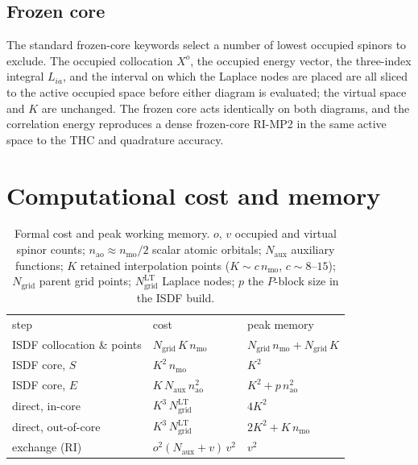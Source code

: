 \documentclass[aip,jcp,amsmath,amssymb,preprint,superscriptaddress]{revtex4-2}%
\newcommand{\Naux}{N_{\mathrm{aux}}}
\newcommand{\Ngrid}{N_{\mathrm{grid}}}
\begin{document}
\subsection{Frozen core}

The standard frozen-core keywords select a number of lowest occupied
spinors to exclude. The occupied collocation $X^{o}$, the occupied energy
vector, the three-index integral $L_{ia}$, and the interval on which the
Laplace nodes are placed are all sliced to the active occupied space before
either diagram is evaluated; the virtual space and $K$ are unchanged. The
frozen core acts identically on both diagrams, and the correlation energy
reproduces a dense frozen-core RI-MP2 in the same active space to the THC
and quadrature accuracy.

\section{Computational cost and memory}
\label{sec:cost}

\begin{table}[t]
\caption{Formal cost and peak working memory. $o$, $v$ occupied and virtual
spinor counts; $n_{\mathrm{ao}}\approx n_{\mathrm{mo}}/2$ scalar atomic
orbitals; $\Naux$ auxiliary functions; $K$ retained interpolation points
($K\sim c\,n_{\mathrm{mo}}$, $c\sim 8$--$15$); $\Ngrid$ parent grid points;
$\Ngrid^{\mathrm{LT}}$ Laplace nodes; $p$ the $P$-block size in the ISDF
build.}
\label{tab:cost}
\begin{ruledtabular}
\begin{tabular}{lll}
step & cost & peak memory \\
\colrule
ISDF collocation \& points & $\Ngrid\,K\,n_{\mathrm{mo}}$ &
   $\Ngrid\,n_{\mathrm{mo}} + \Ngrid\,K$ \\
ISDF core, $S$ & $K^{2}\,n_{\mathrm{mo}}$ & $K^{2}$ \\
ISDF core, $E$ & $K\,\Naux\,n_{\mathrm{ao}}^{2}$ &
   $K^{2}+p\,n_{\mathrm{ao}}^{2}$ \\
direct, in-core     & $K^{3}\,\Ngrid^{\mathrm{LT}}$ & $4K^{2}$ \\
direct, out-of-core & $K^{3}\,\Ngrid^{\mathrm{LT}}$ &
   $2K^{2}+K\,n_{\mathrm{mo}}$ \\
exchange (RI)       & $o^{2}(\Naux+v)\,v^{2}$ & $v^{2}$ \\
\end{tabular}
\end{ruledtabular}
\end{table}
\end{document}
